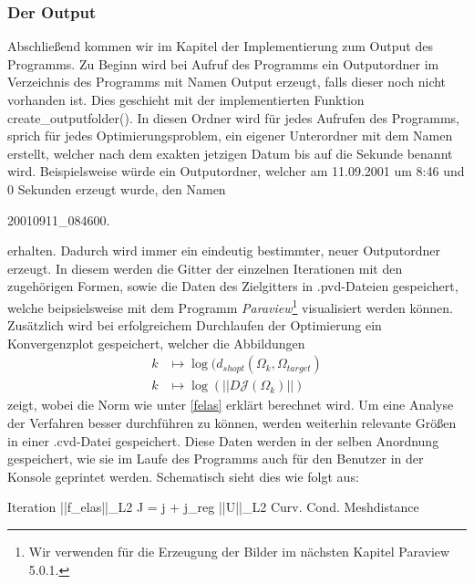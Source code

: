 \subsubsection{Der Output}
Abschließend kommen wir im Kapitel der Implementierung zum Output des Programms.
Zu Beginn wird bei Aufruf des Programms ein Outputordner im Verzeichnis des Programms mit Namen \textsf{Output} erzeugt, falls dieser noch nicht vorhanden ist. Dies geschieht mit der implementierten Funktion \textsf{create\_outputfolder()}. In diesen Ordner wird für jedes Aufrufen des Programms, sprich für jedes Optimierungsproblem, ein eigener Unterordner mit dem Namen erstellt, welcher nach dem exakten jetzigen Datum bis auf die Sekunde benannt wird. Beispielsweise würde ein Outputordner, welcher am 11.09.2001 um 8:46 und 0 Sekunden erzeugt wurde, den Namen 
\begin{center}
\textsf{20010911\_084600}.
\end{center}
erhalten. Dadurch wird immer ein eindeutig bestimmter, neuer Outputordner erzeugt. In diesem werden die Gitter der einzelnen Iterationen mit den zugehörigen Formen, sowie die Daten des Zielgitters in \textsf{.pvd}-Dateien gespeichert, welche beipsielsweise mit dem Programm \textit{Paraview}\footnote{Wir verwenden für die Erzeugung der Bilder im nächsten Kapitel Paraview 5.0.1.} visualisiert werden können. Zusätzlich wird bei erfolgreichem Durchlaufen der Optimierung ein Konvergenzplot gespeichert, welcher die Abbildungen
\begin{align*}
k &\mapsto \log(d_{shopt}(\Omega_k, \Omega_{target}) \\
k &\mapsto \log(\vert\vert D\mathcal{J}(\Omega_k) \vert\vert)
\end{align*}
zeigt, wobei die Norm wie unter \ref{felas} erklärt berechnet wird. Um eine Analyse der Verfahren besser durchführen zu können, werden weiterhin relevante Größen in einer \textsf{.cvd}-Datei gespeichert. Diese Daten werden in der selben Anordnung gespeichert, wie sie im Laufe des Programms auch für den Benutzer in der Konsole geprintet werden. Schematisch sieht dies wie folgt aus:
\begin{center}
\textsf{Iteration \hspace{0.1cm}  ||f\_elas||\_L2 \hspace{0.1cm}  J = j + j\_reg   \hspace{0.1cm} ||U||\_L2 \hspace{0.1cm}  Curv. Cond. \hspace{0.1cm} Meshdistance}
\end{center}


